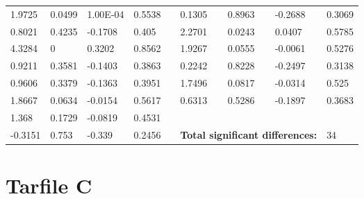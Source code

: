 \begin{table}[h!]
\begin{tabular}{lllllllll}
1.9725 & 0.0499 & 1.00E-04 & 0.5538 &  & 0.1305 & 0.8963 & -0.2688 & 0.3069 \\
0.8021 & 0.4235 & -0.1708 & 0.405 &  & 2.2701 & 0.0243 & 0.0407 & 0.5785 \\
4.3284 & 0 & 0.3202 & 0.8562 &  & 1.9267 & 0.0555 & -0.0061 & 0.5276 \\
0.9211 & 0.3581 & -0.1403 & 0.3863 &  & 0.2242 & 0.8228 & -0.2497 & 0.3138 \\
0.9606 & 0.3379 & -0.1363 & 0.3951 &  & 1.7496 & 0.0817 & -0.0314 & 0.525 \\
1.8667 & 0.0634 & -0.0154 & 0.5617 &  & 0.6313 & 0.5286 & -0.1897 & 0.3683 \\ \cline{6-9} 
1.368 & 0.1729 & -0.0819 & 0.4531 &  &  &  &  &  \\
-0.3151 & 0.753 & -0.339 & 0.2456 &  & \multicolumn{3}{l}{\textbf{Total significant differences:}} & 34
\end{tabular}
\end{table}


\chapter{Tarfile C}

